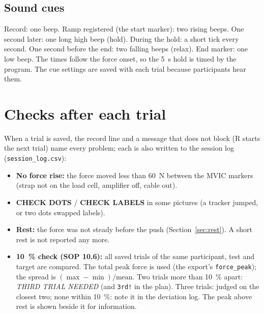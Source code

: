 \documentclass[a4paper,10pt]{article}
\newcommand{\code}[1]{\texttt{#1}}
\begin{document}
\subsection{Sound cues}
Record: one beep. Ramp registered (the start marker): two rising beeps. One second later: one long high beep (hold). During the hold: a
short tick every second. One second before the end: two falling beeps (relax). End marker: one low beep. The times follow the force onset,
so the 5~s hold is timed by the program. The cue settings are saved with each trial because participants hear them.

\section{Checks after each trial}
When a trial is saved, the record line and a message that does not block (R starts the next trial) name every problem; each is also
written to the session log (\code{session\_log.csv}):
\begin{itemize}
\item \textbf{No force rise:} the force moved less than 60~N between the MVIC markers (strap not on the load cell, amplifier off, cable out).
\item \textbf{CHECK DOTS} / \textbf{CHECK LABELS} in some pictures (a tracker jumped, or two dots swapped labels).
\item \textbf{Rest:} the force was not steady before the push (Section~\ref{sec:rest}). A short rest is not reported any more.
\item \textbf{10~\% check (SOP 10.6):} all saved trials of the same participant, test and target are compared. The total peak force is
  used (the export's \code{force\_peak}); the spread is $(\max-\min)/\text{mean}$. Two trials more than 10~\% apart: \emph{THIRD TRIAL
  NEEDED} (and \code{3rd!} in the plan). Three trials: judged on the closest two; none within 10~\%: note it in the deviation log. The
  peak above rest is shown beside it for information.
\end{itemize}
\end{document}
